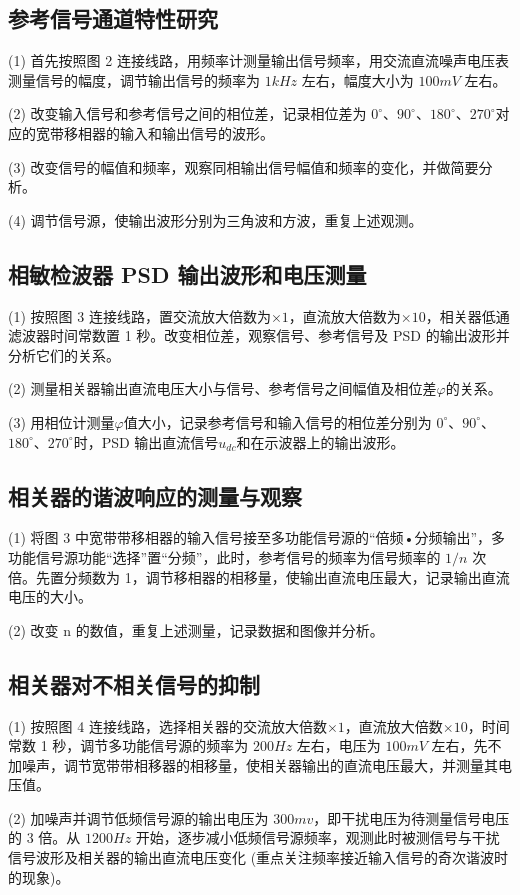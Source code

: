 \documentclass{whureport}
\begin{document}
\begin{multicols}{2}
\subsection{参考信号通道特性研究}
(1) 首先按照图 2 连接线路，用频率计测量输出信号频率，用交流直流噪声电压表测量信号的幅度，调节输出信号的频率为 $1kHz$ 左右，幅度大小为 $100mV$ 左右。

(2) 改变输入信号和参考信号之间的相位差，记录相位差为 $0^\circ$、$90^\circ$、$180^\circ$、$270^\circ$对应的宽带移相器的输入和输出信号的波形。

(3) 改变信号的幅值和频率，观察同相输出信号幅值和频率的变化，并做简要分析。

(4) 调节信号源，使输出波形分别为三角波和方波，重复上述观测。

\subsection{相敏检波器 PSD 输出波形和电压测量}
(1) 按照图 3 连接线路，置交流放大倍数为$\times1$，直流放大倍数为$\times10$，相关器低通滤波器时间常数置 1 秒。改变相位差，观察信号、参考信号及 PSD 的输出波形并分析它们的关系。

(2) 测量相关器输出直流电压大小与信号、参考信号之间幅值及相位差$\varphi$的关系。

(3) 用相位计测量$\varphi$值大小，记录参考信号和输入信号的相位差分别为 $0^\circ$、$90^\circ$、$180^\circ$、$270^\circ$时，PSD 输出直流信号$u_{dc}$和在示波器上的输出波形。

\subsection{相关器的谐波响应的测量与观察}
(1) 将图 3 中宽带带移相器的输入信号接至多功能信号源的“倍频•分频输出”，多功能信号源功能“选择”置“分频”，此时，参考信号的频率为信号频率的 $1/n$ 次倍。先置分频数为 1，调节移相器的相移量，使输出直流电压最大，记录输出直流电压的大小。

(2) 改变 n 的数值，重复上述测量，记录数据和图像并分析。

\subsection{相关器对不相关信号的抑制}
(1) 按照图 4 连接线路，选择相关器的交流放大倍数$\times1$，直流放大倍数$\times10$，时间常数 1 秒，调节多功能信号源的频率为 $200Hz$ 左右，电压为 $100mV$ 左右，先不加噪声，调节宽带带相移器的相移量，使相关器输出的直流电压最大，并测量其电压值。

(2) 加噪声并调节低频信号源的输出电压为 $300mv$，即干扰电压为待测量信号电压的 3 倍。从 $1200Hz$ 开始，逐步减小低频信号源频率，观测此时被测信号与干扰信号波形及相关器的输出直流电压变化 (重点关注频率接近输入信号的奇次谐波时的现象)。


\end{multicols}
\end{document}
